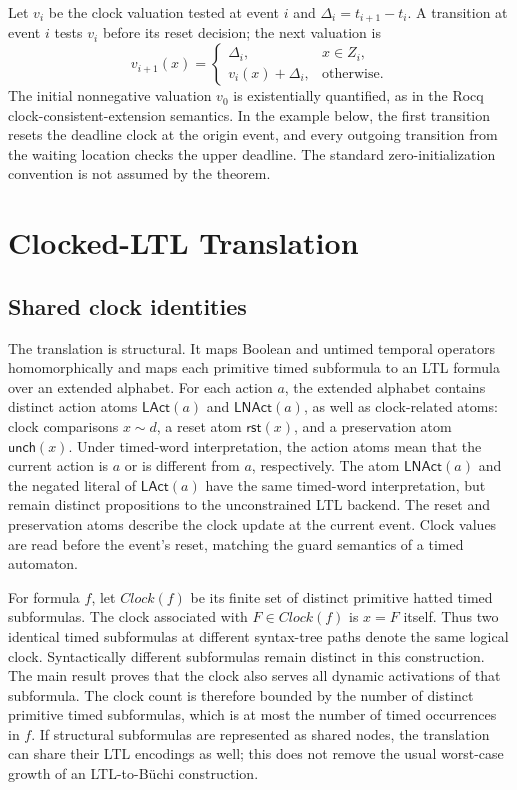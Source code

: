\documentclass[10pt,journal,compsoc]{IEEEtran}
\newcommand{\Reset}{\mathsf{rst}}
\newcommand{\Unch}{\mathsf{unch}}
\newcommand{\Clock}{\mathit{Clock}}
\begin{document}
Let $v_i$ be the clock valuation tested at event $i$ and
$\Delta_i=t_{i+1}-t_i$. A transition at event $i$ tests $v_i$ before its
reset decision; the next valuation is
\[
v_{i+1}(x)=
\begin{cases}
\Delta_i,&x\in Z_i,\\
v_i(x)+\Delta_i,&\text{otherwise.}
\end{cases}
\]
The initial nonnegative valuation $v_0$ is existentially quantified, as in
the Rocq clock-consistent-extension semantics. In the example below, the
first transition resets the deadline clock at the origin event, and every
outgoing transition from the waiting location checks the upper deadline.
The standard zero-initialization convention is not assumed by the theorem.

\section{Clocked-LTL Translation}
\label{sec:translation}
\subsection{Shared clock identities}
The translation is structural. It maps Boolean and untimed temporal
operators homomorphically and maps each primitive timed subformula to an LTL
formula over an extended alphabet. For each action $a$, the extended
alphabet contains distinct action atoms $\mathsf{LAct}(a)$ and
$\mathsf{LNAct}(a)$, as well as clock-related atoms: clock comparisons
$x\sim d$, a reset atom
$\Reset(x)$, and a preservation atom $\Unch(x)$. Under timed-word
interpretation, the action atoms mean that the current action is $a$ or is
different from $a$, respectively. The atom $\mathsf{LNAct}(a)$ and the
negated literal of $\mathsf{LAct}(a)$ have the same timed-word interpretation,
but remain distinct propositions to the unconstrained LTL backend. The reset
and preservation atoms describe the clock update at the current event. Clock
values are read before the event's reset, matching the guard semantics of a
timed automaton.

For formula $f$, let $\Clock(f)$ be its finite set of distinct primitive
hatted timed subformulas. The clock associated with $F\in\Clock(f)$ is
$x=F$ itself. Thus two identical timed subformulas at different syntax-tree
paths denote the same logical clock. Syntactically different subformulas
remain distinct in this construction. The main result proves that the clock
also serves all dynamic activations of that subformula.
The clock count is therefore bounded by the number of distinct primitive
timed subformulas, which is at most the number of timed occurrences in $f$.
If structural subformulas are represented as shared nodes, the translation
can share their LTL encodings as well; this does not remove the usual
worst-case growth of an LTL-to-B\"uchi construction.
\end{document}
